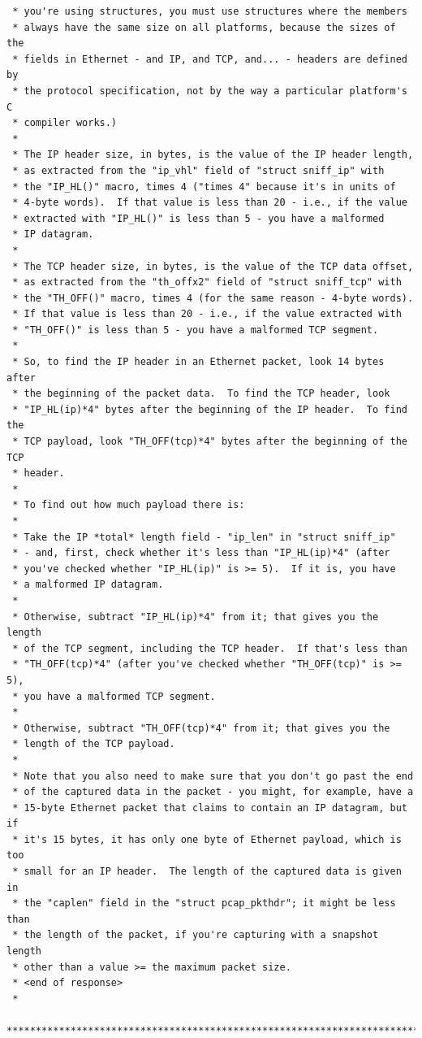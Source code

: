 \documentclass[12pt,english,oneside]{book}
\begin{document}
\begin{lstlisting}
 * you're using structures, you must use structures where the members 
 * always have the same size on all platforms, because the sizes of the 
 * fields in Ethernet - and IP, and TCP, and... - headers are defined by 
 * the protocol specification, not by the way a particular platform's C 
 * compiler works.)
 *
 * The IP header size, in bytes, is the value of the IP header length,
 * as extracted from the "ip_vhl" field of "struct sniff_ip" with
 * the "IP_HL()" macro, times 4 ("times 4" because it's in units of
 * 4-byte words).  If that value is less than 20 - i.e., if the value
 * extracted with "IP_HL()" is less than 5 - you have a malformed
 * IP datagram.
 *
 * The TCP header size, in bytes, is the value of the TCP data offset,
 * as extracted from the "th_offx2" field of "struct sniff_tcp" with
 * the "TH_OFF()" macro, times 4 (for the same reason - 4-byte words).
 * If that value is less than 20 - i.e., if the value extracted with
 * "TH_OFF()" is less than 5 - you have a malformed TCP segment.
 *
 * So, to find the IP header in an Ethernet packet, look 14 bytes after 
 * the beginning of the packet data.  To find the TCP header, look 
 * "IP_HL(ip)*4" bytes after the beginning of the IP header.  To find the
 * TCP payload, look "TH_OFF(tcp)*4" bytes after the beginning of the TCP
 * header.
 * 
 * To find out how much payload there is:
 *
 * Take the IP *total* length field - "ip_len" in "struct sniff_ip" 
 * - and, first, check whether it's less than "IP_HL(ip)*4" (after
 * you've checked whether "IP_HL(ip)" is >= 5).  If it is, you have
 * a malformed IP datagram.
 *
 * Otherwise, subtract "IP_HL(ip)*4" from it; that gives you the length
 * of the TCP segment, including the TCP header.  If that's less than
 * "TH_OFF(tcp)*4" (after you've checked whether "TH_OFF(tcp)" is >= 5),
 * you have a malformed TCP segment.
 *
 * Otherwise, subtract "TH_OFF(tcp)*4" from it; that gives you the
 * length of the TCP payload.
 *
 * Note that you also need to make sure that you don't go past the end 
 * of the captured data in the packet - you might, for example, have a 
 * 15-byte Ethernet packet that claims to contain an IP datagram, but if 
 * it's 15 bytes, it has only one byte of Ethernet payload, which is too 
 * small for an IP header.  The length of the captured data is given in 
 * the "caplen" field in the "struct pcap_pkthdr"; it might be less than 
 * the length of the packet, if you're capturing with a snapshot length 
 * other than a value >= the maximum packet size.
 * <end of response>
 * 
 ****************************************************************************

\end{lstlisting}
\end{document}
